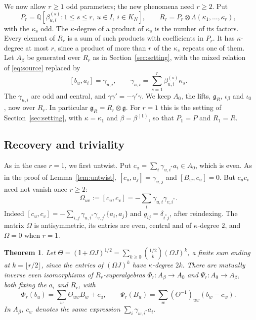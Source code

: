\documentclass[11pt]{article}
\numberwithin{equation}{section}
\newtheorem{theorem}{Theorem}[section]
\theoremstyle{definition}
\theoremstyle{remark}
\begin{document}
We now allow $r\geq1$ odd parameters; the new phenomena need $r\geq2$. Put
\[
 P_r=\mathbb Q[\beta^{(s)}_{u,i}:1\leq s\leq r,\ u\in I,\ i\in K_N],\qquad
 R_r=P_r\otimes\Lambda(\kappa_1,\ldots,\kappa_r),
\]
with the $\kappa_s$ odd. The $\kappa$-degree of a product of $\kappa_s$ is the number of its factors.
Every element of $R_r$ is a sum of such products with coefficients in $P_r$. It has $\kappa$-degree at most $r$, since a product of more than $r$ of the $\kappa_s$ repeats one of them. Let $A_\beta$ be generated
over $R_r$ as in
Section~\ref{sec:setting}, with the mixed relation of \eqref{eq:source} replaced by
\begin{equation}\label{eq:source-multi}
 [b_u,a_i]=\gamma_{u,i},\qquad \gamma_{u,i}=\sum_{s=1}^r\beta^{(s)}_{u,i}\kappa_s .
\end{equation}
The $\gamma_{u,i}$ are odd and central, and $\gamma\gamma'=-\gamma'\gamma$. We keep
$A_0$, the lifts, $\mathfrak g_R$, $\iota_\beta$ and $\iota_0$, now over $R_r$. In particular $\mathfrak g_R=R_r\otimes\mathfrak g$. For $r=1$ this is the
setting of Section~\ref{sec:setting}, with $\kappa=\kappa_1$ and $\beta=\beta^{(1)}$, so that $P_1=P$ and $R_1=R$.

\subsection{Recovery and triviality}\label{sec:multi-triv}

As in the case $r=1$, we first untwist. Put $c_u=\sum_i\gamma_{u,i^*}a_i\in A_0$, which is even. As in the proof of
Lemma~\ref{lem:untwist}, $[c_u,a_j]=\gamma_{u,j}$ and $[B_w,c_u]=0$. But $c_uc_v$ need
not vanish once $r\geq2$:
\begin{equation}\label{eq:Omega}
 \Omega_{uv}:=[c_u,c_v]=-\sum_i\gamma_{u,i}\gamma_{v,i^*}.
\end{equation}
Indeed $[c_u,c_v]=-\sum_{i,j}\gamma_{u,i^*}\gamma_{v,j^*}\{a_i,a_j\}$ and
$g_{ij}=\delta_{i^*j}$, after reindexing. The matrix $\Omega$ is antisymmetric, its entries are even,
central and of $\kappa$-degree $2$, and $\Omega=0$ when $r=1$.

\begin{theorem}\label{thm:untwist-multi}
Let $\Theta=(\mathbb I+\Omega J)^{1/2}=\sum_{k\geq0}\binom{1/2}{k}(\Omega J)^k$, a finite sum ending at
$k=\lfloor r/2\rfloor$, since the entries of $(\Omega J)^k$ have $\kappa$-degree $2k$. There are
mutually inverse even isomorphisms of $R_r$-superalgebras $\Phi_r\colon A_\beta\to A_0$ and
$\Psi_r\colon A_0\to A_\beta$, both fixing the $a_i$ and $R_r$, with
\[
 \Phi_r(b_u)=\sum_w\Theta_{uw}B_w+c_u,\qquad
 \Psi_r(B_u)=\sum_w(\Theta^{-1})_{uw}(b_w-c_w).
\] In $A_\beta$, $c_w$ denotes the
same expression $\sum_i\gamma_{w,i^*}a_i$.
\end{theorem}
\end{document}
